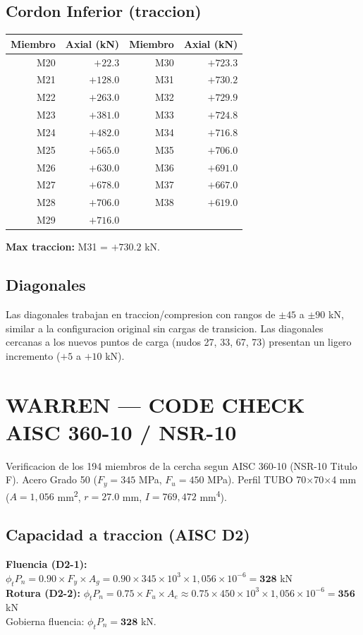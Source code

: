 \documentclass[12pt,a4paper]{article}
\newcommand{\tableheadrow}{\rowcolor{primary!15}\sffamily\footnotesize\bfseries\color{primary}}
\begin{document}
\subsection{Cordon Inferior (traccion)}
\begin{center}
\begin{tabular}{r >{\sffamily}r | r >{\sffamily}r}
\toprule
\tableheadrow
\textbf{Miembro} & \textbf{Axial (kN)} & \textbf{Miembro} & \textbf{Axial (kN)} \\
\midrule
M20 & $+22.3$ & M30 & $+723.3$ \\
M21 & $+128.0$ & M31 & $+730.2$ \\
M22 & $+263.0$ & M32 & $+729.9$ \\
M23 & $+381.0$ & M33 & $+724.8$ \\
M24 & $+482.0$ & M34 & $+716.8$ \\
M25 & $+565.0$ & M35 & $+706.0$ \\
M26 & $+630.0$ & M36 & $+691.0$ \\
M27 & $+678.0$ & M37 & $+667.0$ \\
M28 & $+706.0$ & M38 & $+619.0$ \\
M29 & $+716.0$ & & \\
\bottomrule
\end{tabular}
\end{center}
\textbf{Max traccion:} M31 = \textcolor{secondary}{$+730.2$ kN}.

\subsection{Diagonales}
Las diagonales trabajan en traccion/compresion con rangos de $\pm 45$ a $\pm 90$ kN,
similar a la configuracion original sin cargas de transicion. Las diagonales cercanas
a los nuevos puntos de carga (nudos 27, 33, 67, 73) presentan un ligero incremento
($+5$ a $+10$ kN).

\section{WARREN --- CODE CHECK AISC 360-10 / NSR-10}
Verificacion de los 194 miembros de la cercha segun AISC 360-10 (NSR-10 Titulo F).
Acero Grado 50 ($F_y=345$ MPa, $F_u=450$ MPa). Perfil TUBO 70$\times$70$\times$4 mm
($A=1{,}056$ mm\textsuperscript{2}, $r=27.0$ mm, $I=769{,}472$ mm\textsuperscript{4}).

\subsection{Capacidad a traccion (AISC D2)}
{\sffamily\small
\textbf{Fluencia (D2-1):}
$\phi_t P_n = 0.90 \times F_y \times A_g = 0.90 \times 345{\times}10^3 \times 1{,}056{\times}10^{-6} = \mathbf{328}$ kN
\\[2pt]
\textbf{Rotura (D2-2):}
$\phi_t P_n = 0.75 \times F_u \times A_e \approx 0.75 \times 450{\times}10^3 \times 1{,}056{\times}10^{-6} = \mathbf{356}$ kN
\\[2pt]
Gobierna fluencia: $\phi_t P_n = \mathbf{328}$ kN.
}
\end{document}

